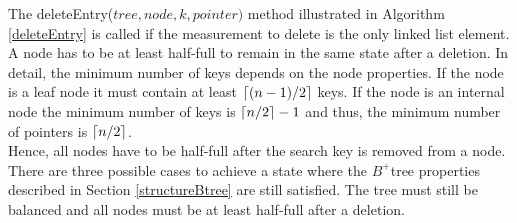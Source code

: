 \documentclass[abstracton,12pt,oneside]{scrreprt}
\DeclarePairedDelimiter\ceil{\lceil}{\rceil}
\begin{document}
\BlankLine
The deleteEntry($tree,node,k,pointer)$ method illustrated in Algorithm \ref{deleteEntry} is called if the measurement to delete is the only linked list element. A node has to be at least half-full to remain in the same state after a deletion. In detail, the minimum number of keys depends on the node properties. If the node is a leaf node it must contain at least $\ceil{(n-1)/2}$ keys. If the node is an internal node the minimum number of keys is $\ceil{n/2}-1$ and thus, the minimum number of pointers is $\ceil{n/2}$. \\ 
Hence, all nodes have to be half-full after the search key is removed from a node. There are three possible cases to achieve a state where the $B^+$tree properties described in Section \ref{structureBtree} are still satisfied. The tree must still be balanced and all nodes must be at least half-full after a deletion.
\end{document}
